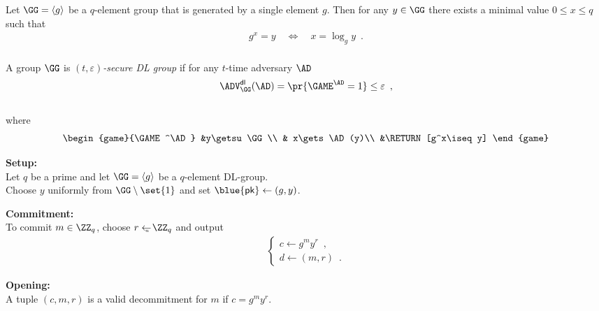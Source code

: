 \documentclass[landscape,footrule]{foils}
\newcommand{\lastline}{\vspace*{-2ex}}
\newcommand{\spreadappart}{\vspace*{\fill}}
\renewcommand{\PK}{{\blue{\mathsf{pk}}}}
\begin{document}
Let $\GG=\langle g\rangle$ be a $q$-element group that is generated by
a single element $g$. Then for any $y\in\GG$ there exists a minimal
value $0\leq x \leq q$ such that\vspace*{-1ex}
\begin{align*}
 g^x=y  \quad\Leftrightarrow\quad x=\log_g y\enspace.
\end{align*}\vspace*{-3ex}\\
A group $\GG$ is \emph{$(t,\varepsilon)$-secure DL group} if for any
$t$-time adversary $\AD$\vspace*{-0ex}
\begin{align*}
  \advDLXX{\GG}{\AD}=\pr{\GAME^\AD=1}\leq\varepsilon\enspace,
\end{align*}\vspace*{-3ex}\\
where\vspace*{-2ex}
\begin{align*}
  \begin{game}{\GAME^\AD}
    &y\getsu\GG\\
    & x\gets\AD(y)\\
    &\RETURN [g^x\iseq y]
  \end{game}
\end{align*}




\textbf{Setup:}\vspace*{1ex}\\
\hspace*{1.5em} Let $q$ be a prime and let $\GG=\langle g\rangle$ be a $q$-element DL-group.\\
\hspace*{1.5em} Choose $y$ uniformly from $\GG\setminus\set{1}$ and set $\PK\gets (g,y)$.
\bigskip\spreadappart

\textbf{Commitment:}\vspace*{1ex}\\
\hspace*{1.5em} To commit $m\in\ZZ_q$, choose $r\getsu\ZZ_q$ and output
\begin{align*}
  \begin{cases}
    c\gets g^m y^r \enspace,\\
    d\gets (m,r)\enspace.
  \end{cases}
\end{align*}
\spreadappart

\textbf{Opening:}\vspace*{1ex}\\
\hspace*{1.5em} A tuple $(c,m,r)$ is a valid decommitment for $m$ if $c=g^my^r$.
\lastline
\end{document}

